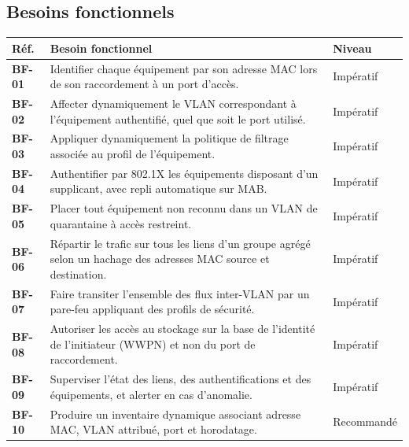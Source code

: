 \documentclass[11pt,a4paper]{article}
\newcommand{\rid}[1]{\textcolor{primary}{\textbf{\small #1}}}
\begin{document}
\subsection{Besoins fonctionnels}
\begin{table}[H]
\centering
\begin{tabularx}{\textwidth}{L{1.4cm} Y C{2.3cm}}
\toprule
{}\textbf{Réf.} & \textbf{Besoin fonctionnel} & \textbf{Niveau} \\
\midrule
\rid{BF-01} & Identifier chaque équipement par son adresse MAC lors de son raccordement à un port d'accès. & Impératif \\
\rid{BF-02} & Affecter dynamiquement le VLAN correspondant à l'équipement authentifié, quel que soit le port utilisé. & Impératif \\
\rid{BF-03} & Appliquer dynamiquement la politique de filtrage associée au profil de l'équipement. & Impératif \\
\rid{BF-04} & Authentifier par 802.1X les équipements disposant d'un supplicant, avec repli automatique sur MAB. & Impératif \\
\rid{BF-05} & Placer tout équipement non reconnu dans un VLAN de quarantaine à accès restreint. & Impératif \\
\rid{BF-06} & Répartir le trafic sur tous les liens d'un groupe agrégé selon un hachage des adresses MAC source et destination. & Impératif \\
\rid{BF-07} & Faire transiter l'ensemble des flux inter-VLAN par un pare-feu appliquant des profils de sécurité. & Impératif \\
\rid{BF-08} & Autoriser les accès au stockage sur la base de l'identité de l'initiateur (WWPN) et non du port de raccordement. & Impératif \\
\rid{BF-09} & Superviser l'état des liens, des authentifications et des équipements, et alerter en cas d'anomalie. & Impératif \\
\rid{BF-10} & Produire un inventaire dynamique associant adresse MAC, VLAN attribué, port et horodatage. & Recommandé \\
\bottomrule
\end{tabularx}
\end{table}
\end{document}
